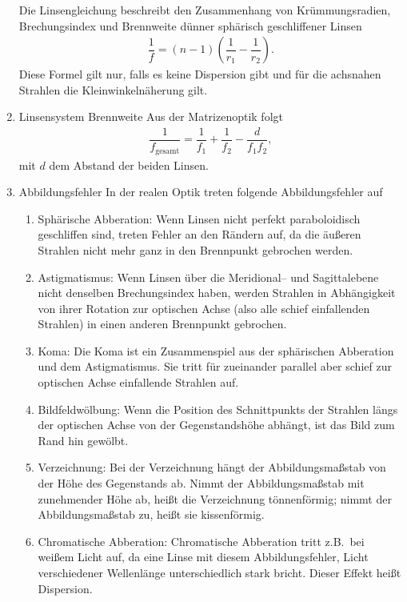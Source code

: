 \begin{enumerate}[label=--]
                Die Linsengleichung beschreibt den Zusammenhang von Krümmungsradien, Brechungsindex und Brennweite dünner sphärisch geschliffener Linsen
                \begin{align} 
                        \dfrac{1}{f}=\left(n-1\right)\left(\dfrac{1}{r_1}-\dfrac{1}{r_2}\right)
                .\end{align} 
                Diese Formel gilt nur, falls es keine Dispersion gibt und für die achsnahen Strahlen die Kleinwinkelnäherung gilt.
        \item Linsensystem Brennweite \hspace{25pt}
                Aus der Matrizenoptik folgt
                \begin{align} 
                        \dfrac{1}{f_\text{gesamt}}=\dfrac{1}{f_1}+\dfrac{1}{f_2}-\dfrac{d}{f_1f_2}
                ,\end{align} 
                mit $d$ dem Abstand der beiden Linsen.
        \item Abbildungsfehler \hspace{25pt}
                In der realen Optik treten folgende Abbildungsfehler auf
                \begin{enumerate}[label=\roman*)]
                        \item Sphärische Abberation: Wenn Linsen nicht perfekt paraboloidisch geschliffen sind, treten Fehler an den Rändern auf, da die äußeren Strahlen nicht mehr ganz in den Brennpunkt gebrochen werden.
                        \item Astigmatismus: Wenn Linsen über die Meridional-- und Sagittalebene nicht denselben Brechungsindex haben, werden Strahlen in Abhängigkeit von ihrer Rotation zur optischen Achse (also alle schief einfallenden Strahlen) in einen anderen Brennpunkt gebrochen.
                        \item Koma: Die Koma ist ein Zusammenspiel aus der sphärischen Abberation und dem Astigmatismus. 
                                Sie tritt für zueinander parallel aber schief zur optischen Achse einfallende Strahlen auf.
                        \item Bildfeldwölbung: Wenn die Position des Schnittpunkts der Strahlen längs der optischen Achse von der Gegenstandshöhe abhängt, ist das Bild zum Rand hin gewölbt.
                        \item Verzeichnung: Bei der Verzeichnung hängt der Abbildungsmaßstab von der Höhe des Gegenstands ab.
                                Nimmt der Abbildungsmaßstab mit zunehmender Höhe ab, heißt die Verzeichnung tönnenförmig; nimmt der Abbildungsmaßstab zu, heißt sie kissenförmig.
                        \item Chromatische Abberation: Chromatische Abberation tritt z.B.\ bei weißem Licht auf, da eine Linse mit diesem Abbildungsfehler, Licht verschiedener Wellenlänge unterschiedlich stark bricht.
                                Dieser Effekt heißt Dispersion.
                \end{enumerate}
\end{enumerate}
